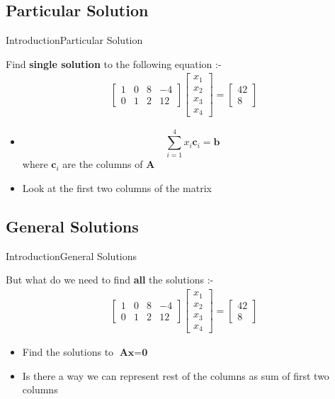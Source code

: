 \documentclass[10pt]{beamer}
\begin{document}
\subsection{Particular Solution}
\begin{frame}{Introduction}{Particular Solution}

Find \textbf{single solution} to the following equation :- 
\begin{align}
\begin{bmatrix} 1 & 0 & 8 & -4 \\ 0 & 1 & 2 & 12 \end{bmatrix}\begin{bmatrix}x_{1}\\x_{2}\\x_{3}\\x_{4}\end{bmatrix} = \begin{bmatrix}42\\8\end{bmatrix}
\end{align}

\pause 
\begin{itemize}
\item $$ \sum_{i=1}^{4}x_{i}\textbf{c}_{i} = \textbf{b}$$ where $\textbf{c}_{i}$ are the columns of $\textbf{A}$
\pause
\item Look at the first two columns of the matrix
\end{itemize}



\end{frame}

\subsection{General Solutions}
\begin{frame}{Introduction}{General Solutions}

But what do we need to find \textbf{all} the solutions :- 
\begin{align}
\begin{bmatrix} 1 & 0 & 8 & -4 \\ 0 & 1 & 2 & 12 \end{bmatrix}\begin{bmatrix}x_{1}\\x_{2}\\x_{3}\\x_{4}\end{bmatrix} = \begin{bmatrix}42\\8\end{bmatrix}
\end{align}
\pause
 
\begin{itemize}
\item Find the solutions to $\textbf{A}\textbf{x}= \textbf{0}$
\pause
\item Is there a way we can represent rest of the columns as sum of first two columns
\end{itemize}
\end{frame}
\end{document}
